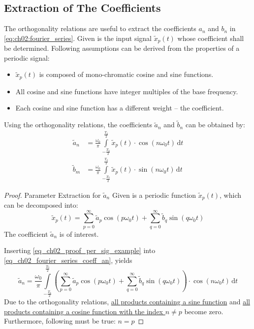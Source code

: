 \begin{refsection}
\subsection{Extraction of The Coefficients}

The orthogonality relations are useful to extract the coefficients $a_n$ and $b_n$ in \eqref{eq:ch02:fourier_series}. Given is the input signal $\tilde{x}_p(t)$ whose coefficient shall be determined. Following assumptions can be derived from the properties of a periodic signal:
\begin{itemize}
	\item $\tilde{x}_p(t)$ is composed of mono-chromatic cosine and sine functions.
	\item All cosine and sine functions have integer multiples of the base frequency.
	\item Each cosine and sine function has a different weight -- the coefficient.
\end{itemize}

Using the orthogonality relations, the coefficients $\tilde{a}_n$ and $\tilde{b}_n$ can be obtained by:
\begin{subequations}
	\begin{align}
		\tilde{a}_n &= \frac{\omega_0}{\pi} \int\limits_{-\frac{T_0}{2}}^{\frac{T_0}{2}} \tilde{x}_p(t) \cdot \cos\left(n \omega_0 t\right) \, \mathrm{d} t \label{eq_ch02_fourier_series_coeff_an} \\
		\tilde{b}_m &= \frac{\omega_0}{\pi} \int\limits_{-\frac{T_0}{2}}^{\frac{T_0}{2}} \tilde{x}_p(t) \cdot \sin\left(n \omega_0 t\right) \, \mathrm{d} t \label{eq_ch02_fourier_series_coeff_bm}
	\end{align}
\end{subequations}

\begin{proof}{Parameter Extraction for $\tilde{a}_n$}
	Given is a periodic function $\tilde{x}_p(t)$, which can be decomposed into:
	\begin{equation}
		\tilde{x}_p(t) = \sum\limits_{p=0}^{\infty} \tilde{a}_p \cos\left(p \omega_0 t\right) + \sum\limits_{q=0}^{\infty} \tilde{b}_q \sin\left(q \omega_0 t\right)
		\label{eq_ch02_proof_per_sig_example}
	\end{equation}
	The coefficient $\tilde{a}_n$ is of interest.
	
	Inserting \eqref{eq_ch02_proof_per_sig_example} into \eqref{eq_ch02_fourier_series_coeff_an}, yields
	\begin{equation}
		\tilde{a}_n = \frac{\omega_0}{\pi} \int\limits_{-\frac{T_0}{2}}^{\frac{T_0}{2}} \left(\sum\limits_{p=0}^{\infty} \tilde{a}_p \cos\left(p \omega_0 t\right) + \sum\limits_{q=0}^{\infty} \tilde{b}_q \sin\left(q \omega_0 t\right)\right) \cdot \cos\left(n \omega_0 t\right) \, \mathrm{d} t
	\end{equation}
	Due to the orthogonality relations, \underline{all products containing a sine function} and \underline{all products containing a cosine function with the index $n \neq p$} become zero. Furthermore, following must be true: $n = p$
	

\end{proof}
\end{refsection}
